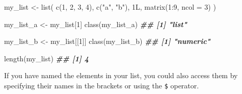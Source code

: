 \documentclass[
]{book}
\newenvironment{Shaded}{\begin{snugshade}}{\end{snugshade}}
\newcommand{\AttributeTok}[1]{\textcolor[rgb]{0.77,0.63,0.00}{#1}}
\newcommand{\DecValTok}[1]{\textcolor[rgb]{0.00,0.00,0.81}{#1}}
\newcommand{\DocumentationTok}[1]{\textcolor[rgb]{0.56,0.35,0.01}{\textbf{\textit{#1}}}}
\newcommand{\FunctionTok}[1]{\textcolor[rgb]{0.00,0.00,0.00}{#1}}
\newcommand{\NormalTok}[1]{#1}
\newcommand{\OtherTok}[1]{\textcolor[rgb]{0.56,0.35,0.01}{#1}}
\newcommand{\SpecialCharTok}[1]{\textcolor[rgb]{0.00,0.00,0.00}{#1}}
\newcommand{\StringTok}[1]{\textcolor[rgb]{0.31,0.60,0.02}{#1}}
\begin{document}
\begin{Shaded}
\begin{Highlighting}[]
\NormalTok{my\_list }\OtherTok{\textless{}{-}} \FunctionTok{list}\NormalTok{(}
  \FunctionTok{c}\NormalTok{(}\DecValTok{1}\NormalTok{, }\DecValTok{2}\NormalTok{, }\DecValTok{3}\NormalTok{, }\DecValTok{4}\NormalTok{),}
  \FunctionTok{c}\NormalTok{(}\StringTok{"a"}\NormalTok{, }\StringTok{"b"}\NormalTok{),}
\NormalTok{  1L,}
  \FunctionTok{matrix}\NormalTok{(}\DecValTok{1}\SpecialCharTok{:}\DecValTok{9}\NormalTok{, }\AttributeTok{ncol =} \DecValTok{3}\NormalTok{)}
\NormalTok{)}

\NormalTok{my\_list\_a }\OtherTok{\textless{}{-}}\NormalTok{ my\_list[}\DecValTok{1}\NormalTok{]}
\FunctionTok{class}\NormalTok{(my\_list\_a)}
\DocumentationTok{\#\# [1] "list"}

\NormalTok{my\_list\_b }\OtherTok{\textless{}{-}}\NormalTok{ my\_list[[}\DecValTok{1}\NormalTok{]]}
\FunctionTok{class}\NormalTok{(my\_list\_b)}
\DocumentationTok{\#\# [1] "numeric"}

\FunctionTok{length}\NormalTok{(my\_list)}
\DocumentationTok{\#\# [1] 4}
\end{Highlighting}
\end{Shaded}

If you have named the elements in your list, you could also access them by specifying their names in the brackets or using the \texttt{\$} operator.

\begin{Shaded}
\end{Shaded}
\end{document}
